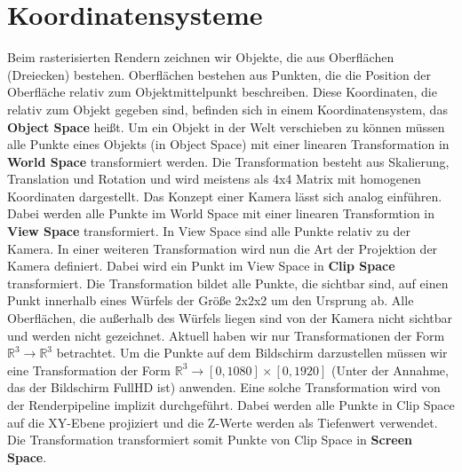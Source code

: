 \section{Koordinatensysteme}
\label{section:coords}
Beim rasterisierten Rendern zeichnen wir Objekte, die aus Oberflächen (Dreiecken) bestehen.
Oberflächen bestehen aus Punkten, die die Position der Oberfläche relativ zum Objektmittelpunkt beschreiben.
Diese Koordinaten, die relativ zum Objekt gegeben sind, befinden sich in einem Koordinatensystem, das \textbf{Object Space} heißt.
Um ein Objekt in der Welt verschieben zu können müssen alle Punkte eines Objekts (in Object Space) mit einer linearen Transformation
in \textbf{World Space} transformiert werden.
Die Transformation besteht aus Skalierung, Translation und Rotation und wird meistens als 4x4 Matrix mit homogenen Koordinaten dargestellt.
Das Konzept einer Kamera lässt sich analog einführen.
Dabei werden alle Punkte im World Space mit einer linearen Transformtion in \textbf{View Space} transformiert.
In View Space sind alle Punkte relativ zu der Kamera.
In einer weiteren Transformation wird nun die Art der Projektion der Kamera definiert. 
Dabei wird ein Punkt im View Space in \textbf{Clip Space} transformiert.
Die Transformation bildet alle Punkte, die sichtbar sind, auf einen Punkt innerhalb eines Würfels der Größe 2x2x2 um den Ursprung ab.
Alle Oberflächen, die außerhalb des Würfels liegen sind von der Kamera nicht sichtbar und werden nicht gezeichnet.
Aktuell haben wir nur Transformationen der Form $\mathbb{R}^3 \rightarrow \mathbb{R}^3$ betrachtet.
Um die Punkte auf dem Bildschirm darzustellen müssen wir eine Transformation der Form 
$\mathbb{R}^3 \rightarrow [0,1080]\times[0,1920]$ (Unter der Annahme, das der Bildschirm FullHD ist) anwenden.
Eine solche Transformation wird von der Renderpipeline implizit durchgeführt. 
Dabei werden alle Punkte in Clip Space 
auf die XY-Ebene projiziert und die Z-Werte werden als Tiefenwert verwendet. 
Die Transformation transformiert somit Punkte von Clip Space in \textbf{Screen Space}.

